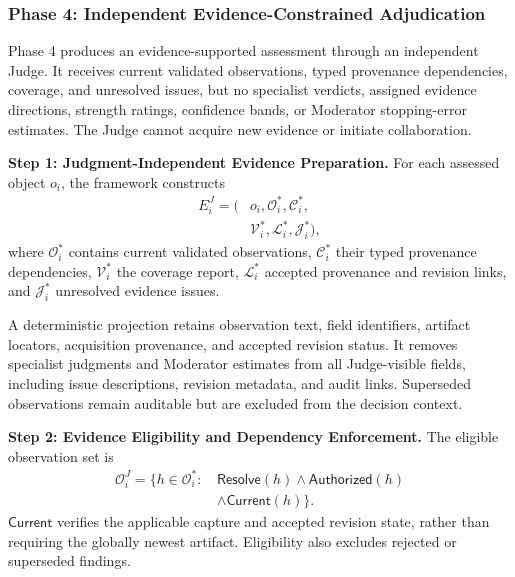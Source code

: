 \subsubsection*{\textbf{Phase 4: Independent
Evidence-Constrained Adjudication}}
\label{sec:phase4}

Phase 4 produces an evidence-supported
assessment through an independent Judge.
It receives current validated observations,
typed provenance dependencies, coverage,
and unresolved issues, but no specialist
verdicts, assigned evidence directions,
strength ratings, confidence bands, or
Moderator stopping-error estimates.
The Judge cannot acquire new evidence
or initiate collaboration.

\medskip
\noindent\textbf{Step 1: Judgment-Independent
Evidence Preparation.}
For each assessed object $o_i$, the
framework constructs
\begin{equation}
\begin{aligned}
E_i^J=\big(
&o_i,\mathcal O_i^*,
\mathcal C_i^*,\\
&\mathcal V_i^*,\mathcal L_i^*,
\mathcal J_i^*
\big),
\end{aligned}
\label{eq:judge-input}
\end{equation}
where $\mathcal O_i^*$ contains
current validated observations,
$\mathcal C_i^*$ their typed
provenance dependencies,
$\mathcal V_i^*$ the coverage
report, $\mathcal L_i^*$ accepted
provenance and revision links,
and $\mathcal J_i^*$ unresolved
evidence issues.

A deterministic projection retains
observation text, field identifiers,
artifact locators, acquisition
provenance, and accepted revision
status. It removes specialist
judgments and Moderator estimates
from all Judge-visible fields,
including issue descriptions,
revision metadata, and audit links.
Superseded observations remain
auditable but are excluded from
the decision context.

\medskip
\noindent\textbf{Step 2: Evidence Eligibility
and Dependency Enforcement.}
The eligible observation set is
\begin{equation}
\begin{aligned}
\mathcal O_i^J=
\{h\in\mathcal O_i^*:\,
&\mathsf{Resolve}(h)
\land\mathsf{Authorized}(h)\\
&\land\mathsf{Current}(h)\}.
\end{aligned}
\label{eq:judge-eligible}
\end{equation}
$\mathsf{Current}$ verifies the
applicable capture and accepted
revision state, rather than
requiring the globally newest
artifact. Eligibility also
excludes rejected or superseded
findings.

